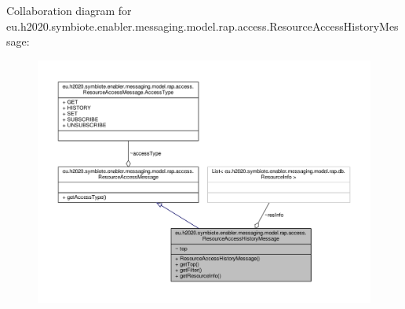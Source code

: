 Collaboration diagram for eu.\+h2020.\+symbiote.\+enabler.\+messaging.\+model.\+rap.\+access.\+Resource\+Access\+History\+Message\+:
\nopagebreak
\begin{figure}[H]
\begin{center}
\leavevmode
\includegraphics[width=350pt]{classeu_1_1h2020_1_1symbiote_1_1enabler_1_1messaging_1_1model_1_1rap_1_1access_1_1ResourceAccessHistoryMessage__coll__graph}
\end{center}
\end{figure}

